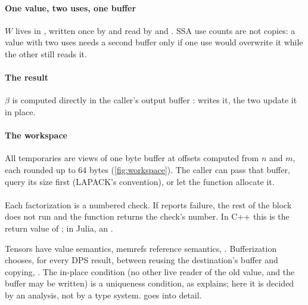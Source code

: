 \paragraph{One value, two uses, one buffer} \(W\) lives in ,
written once by  and read by  and . SSA
use counts are not copies: a value with two uses needs a second buffer only
if one use would overwrite it while the other still reads it.

\paragraph{The result} \(\beta\) is computed directly in the caller's
output buffer :  writes it, the two 
update it in place.

\paragraph{The workspace} All temporaries are views of one byte buffer
 at offsets computed from \(n\) and \(m\), each rounded up to 64
bytes (\cref{fig:workspace}). The caller can pass that buffer, query its size
first (LAPACK's  convention), or let the function allocate it.

\paragraph{} Each factorization is a numbered check. If
 reports failure, the rest of the block does not run and the
function returns the check's number. In C++ this is the return value of
; in Julia, an .

\begin{theory}
Tensors have value semantics, memrefs reference semantics,
.
Bufferization chooses, for every DPS result, between reusing the
destination's buffer and copying, . The in-place condition (no other live reader of
the old value, and the buffer may be written) is a uniqueness condition, as
 explains; here it is decided by
an analysis, not by a type system.  goes into detail.
\end{theory}

